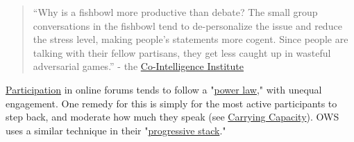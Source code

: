 \begin{quote}
``Why is a fishbowl more productive than debate? The small group
conversations in the fishbowl tend to de-personalize the issue and
reduce the stress level, making people's statements more cogent. Since
people are talking with their fellow partisans, they get less caught up
in wasteful adversarial games.'' - the
\href{http://www.co-intelligence.org/y2k\_fishbowl.html}{Co-Intelligence
Institute}
\end{quote}
\href{http://peeragogy.org/organizing-a-learning-context/participation/}{Participation}
in online forums tends to follow a
"\href{http://en.wikipedia.org/wiki/Power\_law}{power law}," with
unequal engagement. One remedy for this is simply for the most active
participants to step back, and moderate how much they speak (see
\href{http://peeragogy.org/patterns-usecases/patterns-and-heuristics/carrying-capacity/}{Carrying
Capacity}). OWS uses a similar technique in their
"\href{http://en.wikipedia.org/wiki/Progressive\_stack}{progressive
stack}."
